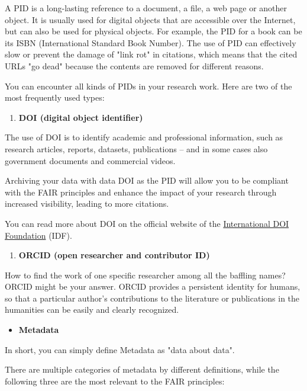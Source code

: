 \documentclass[
]{book}
\providecommand{\tightlist}{%
  \setlength{\itemsep}{0pt}\setlength{\parskip}{0pt}}
\begin{document}
A PID is a long-lasting reference to a document, a file, a web page or another object. It is usually used for digital objects that are accessible over the Internet, but can also be used for physical objects. For example, the PID for a book can be its ISBN (International Standard Book Number). The use of PID can effectively slow or prevent the damage of "link rot" in citations, which means that the cited URLs "go dead" because the contents are removed for different reasons.

You can encounter all kinds of PIDs in your research work. Here are two of the most frequently used types:

\begin{enumerate}
\def\labelenumi{\arabic{enumi}.}
\tightlist
\item
  \textbf{DOI (digital object identifier)}
\end{enumerate}

The use of DOI is to identify academic and professional information, such as research articles, reports, datasets, publications -- and in some cases also government documents and commercial videos.

Archiving your data with data DOI as the PID will allow you to be compliant with the FAIR principles and enhance the impact of your research through increased visibility, leading to more citations.

You can read more about DOI on the official website of the \href{https://www.doi.org/}{International DOI Foundation} (IDF).

\begin{enumerate}
\def\labelenumi{\arabic{enumi}.}
\tightlist
\item
  \textbf{ORCID (open researcher and contributor ID)}
\end{enumerate}

How to find the work of one specific researcher among all the baffling names? ORCID might be your answer. ORCID provides a persistent identity for humans, so that a particular author's contributions to the literature or publications in the humanities can be easily and clearly recognized.

\begin{itemize}
\tightlist
\item
  \textbf{Metadata}
\end{itemize}

In short, you can simply define Metadata as "data about data".

There are multiple categories of metadata by different definitions, while the following three are the most relevant to the FAIR principles:
\end{document}
